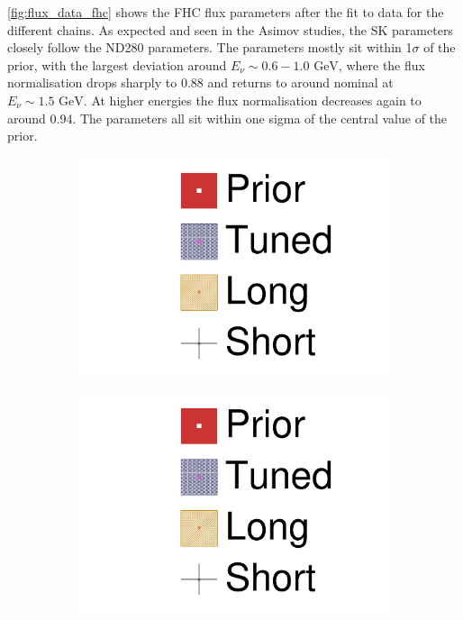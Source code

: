 \autoref{fig:flux_data_fhc} shows the FHC flux parameters after the fit to data for the different chains. As expected and seen in the Asimov studies, the SK parameters closely follow the ND280 parameters. The parameters mostly sit within 1$\sigma$ of the prior, with the largest deviation around $E_\nu \sim 0.6-1.0\text{ GeV}$, where the flux normalisation drops sharply to 0.88 and returns to around nominal at $E_\nu\sim1.5\text{ GeV}$. At higher energies the flux normalisation decreases again to around 0.94. The parameters all sit within one sigma of the central value of the prior.
\begin{figure}[h]
	\begin{subfigure}[t]{0.2\textwidth}
		\includegraphics[width=\textwidth, trim={0mm 150mm 50mm 0mm}, clip,page=1]{figures/mach3/data/2017b_NewData_NewDet_UpdXsecStep_2Xsec_4Det_5Flux_0_2017b_June_NewDet_merge_2017b_NewDet_June_Long_0}
	\end{subfigure}
\begin{subfigure}[t]{0.2\textwidth}
\includegraphics[width=\textwidth, trim={0mm 100mm 50mm 50mm}, clip,page=1]{figures/mach3/data/2017b_NewData_NewDet_UpdXsecStep_2Xsec_4Det_5Flux_0_2017b_June_NewDet_merge_2017b_NewDet_June_Long_0}

\end{subfigure}
\end{figure}
